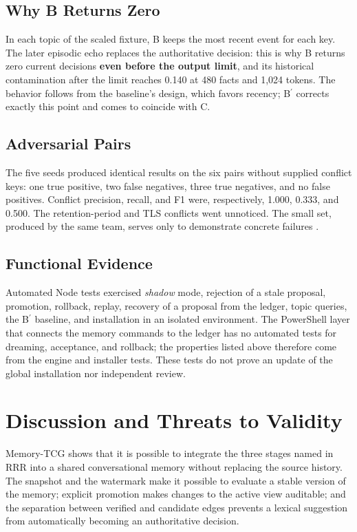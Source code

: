\documentclass[11pt,a4paper]{article}
\begin{document}
\subsection{Why B Returns Zero}\label{sec:5.4}
In each topic of the scaled fixture, B keeps the most recent event for each key. The later episodic echo replaces the authoritative decision: this is why B returns zero current decisions \textbf{even before the output limit}, and its historical contamination after the limit reaches 0.140 at 480 facts and 1,024 tokens. The behavior follows from the baseline's design, which favors recency; B\ensuremath{^{\prime}} corrects exactly this point and comes to coincide with C.

\subsection{Adversarial Pairs}\label{sec:5.5}
The five seeds produced identical results on the six pairs without supplied conflict keys: one true positive, two false negatives, three true negatives, and no false positives. Conflict precision, recall, and F1 were, respectively, 1.000, 0.333, and 0.500. The retention-period and TLS conflicts went unnoticed. The small set, produced by the same team, serves only to demonstrate concrete failures \cite{ref9}.

\subsection{Functional Evidence}\label{sec:5.6}
Automated Node tests exercised \emph{shadow} mode, rejection of a stale proposal, promotion, rollback, replay, recovery of a proposal from the ledger, topic queries, the B\ensuremath{^{\prime}} baseline, and installation in an isolated environment. The PowerShell layer that connects the memory commands to the ledger has no automated tests for dreaming, acceptance, and rollback; the properties listed above therefore come from the engine and installer tests. These tests do not prove an update of the global installation nor independent review.

\section{Discussion and Threats to Validity}\label{sec:6}
Memory-TCG shows that it is possible to integrate the three stages named in RRR into a shared conversational memory without replacing the source history. The snapshot and the watermark make it possible to evaluate a stable version of the memory; explicit promotion makes changes to the active view auditable; and the separation between verified and candidate edges prevents a lexical suggestion from automatically becoming an authoritative decision.
\end{document}
